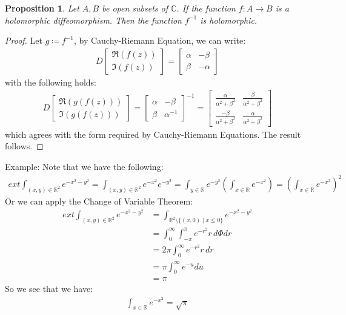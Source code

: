 \documentclass[15pt]{book}
\theoremstyle{break}
\theoremstyle{break}
\newtheorem{prop}[lem]{Proposition}
\newcommand{\R}{\mathbb{R}}
\newcommand{\Complex}{\mathbb{C}}
\newcommand{\bmat}[1]{\begin{bmatrix} #1 \end{bmatrix}}
\newcommand{\example}{\color{green}Example: \color{black}}
\begin{document}
\begin{prop}
Let $A,B$ be open subsets of $\Complex$. If the function $f:A \to B$ is a holomorphic diffeomorphism. Then the function $f^{-1}$ is holomorphic.
\end{prop}
\begin{proof}
Let $g\coloneqq f^{-1}$, by Cauchy-Riemann Equation, we can write:
\begin{align*}
D\bmat{\Re(f(z))\\ \Im(f(z))} = \bmat{\alpha & -\beta \\ \beta &-\alpha}
\end{align*}
with the following holds:
\begin{align*}
D\bmat{\Re(g(f(z)))\\ \Im(g(f(z)))} = \bmat{\alpha & -\beta \\ \beta &\alpha^{-1}}^{-1} = \bmat{\frac{\alpha}{\alpha^2+\beta^2}& \frac{\beta}{\alpha^2+\beta^2} \\ \frac{-\beta}{\alpha^2+\beta^2} & \frac{\alpha}{\alpha^2+\beta^2}}
\end{align*}
which agrees with the form required by Cauchy-Riemann Equations. The result follows.
\end{proof}

\newpage
\example Note that we have the following:
\begin{align*}
ext \int_{(x,y) \in \R^2}e^{-x^2 - y^2} = \int_{(x,y) \in \R^2}e^{-x^2}e^{-y^2} = \int_{y \in \R} e^{-y^2} \left(\int_{x \in \R} e^{-x^2} \right) = \left(\int_{x \in \R} e^{-x^2}\right)^2
\end{align*}
Or we can apply the Change of Variable Theorem:
\begin{align*}
ext \int_{(x,y) \in \R^2}e^{-x^2 - y^2} &= \int_{\R^2\setminus \{(x,0) \mid x\leq 0\}} e^{-x^2-y^2}\\
&= \int_{0}^\infty \int_{-\pi}^{\pi} e^{-r^2} r\, d\Phi dr \\
&= 2\pi \int_{0}^{\infty} e^{-r^2} r\, dr \\
&= \pi \int_{0}^\infty e^{-u} du \\
&= \pi
\end{align*}
So we see that we have:
\begin{align*}
\int_{x \in \R} e^{-x^2} = \sqrt{\pi}
\end{align*}
\end{document}
